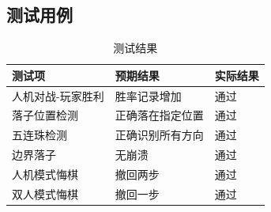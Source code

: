 \documentclass[UTF8]{ctexart}
\begin{document}
\subsection{测试用例}
\begin{table}[h]
    \centering
    \begin{tabular}{lll}
        \toprule
        \textbf{测试项} & \textbf{预期结果} & \textbf{实际结果} \\
        \midrule
        人机对战-玩家胜利 & 胜率记录增加 & 通过 \\
        落子位置检测 & 正确落在指定位置 & 通过 \\
        五连珠检测 & 正确识别所有方向 & 通过 \\
        边界落子 & 无崩溃 & 通过 \\
        人机模式悔棋 & 撤回两步 & 通过 \\
        双人模式悔棋 & 撤回一步 & 通过 \\
        \bottomrule
    \end{tabular}
    \caption{测试结果}
\end{table}
\end{document}
